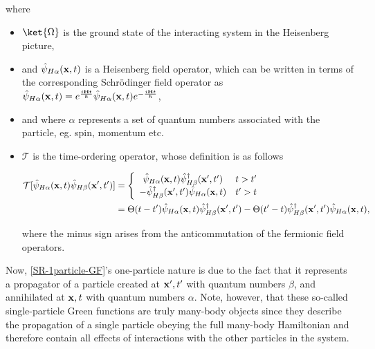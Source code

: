 where \begin{itemize}
    \item $\ket{\Omega}$ is the ground state of the interacting system in the Heisenberg picture,
    \item and $\hat{\psi}_{H \alpha}({\bf x}, t)$ is a Heisenberg field operator, which can be written in terms of the corresponding Schr\"odinger field operator as $\hat{\psi}_{H \alpha}({\bf x}, t) = e^{\frac{i {\bf H} t}{\hbar}} \hat{\psi}_{H \alpha}({\bf x}, t) e^{-\frac{i {\bf H} t}{\hbar}}$, 
    \item and where $\alpha$ represents a set of quantum numbers associated with the particle, eg. spin, momentum etc. \item $\mathcal{T}$ is the time-ordering operator, whose definition is as follows 
    
    \begin{equation} \begin{split}
        \mathcal{T} [\hat{\psi}_{H \alpha}({\bf x}, t) \hat{\psi}_{H \beta}({\bf x}', t')] &= \left\{ \begin{array}{cc}
           \hat{\psi}_{H \alpha}({\bf x}, t) \hat{\psi}^\dagger_{H \beta}({\bf x}', t') & t > t' \\ 
           -  \hat{\psi}^\dagger_{H \beta}({\bf x}', t')   \hat{\psi}_{H \alpha}({\bf x}, t) & t' > t 
        \end{array}\right. \\
        &= \Theta(t-t')\hat{\psi}_{H \alpha}({\bf x}, t) \hat{\psi}^\dagger_{H \beta}({\bf x}', t') - \Theta(t'-t)\hat{\psi}^\dagger_{H \beta}({\bf x}', t')   \hat{\psi}_{H \alpha}({\bf x}, t),
    \end{split}
    \end{equation}
    
    where the minus sign arises from the anticommutation of the fermionic field operators. \\
\end{itemize}

Now, \cref{SR-1particle-GF}'s one-particle nature is due to the fact that it represents a propagator of a particle created at ${\bf x}', t'$ with quantum numbers $\beta$, and annihilated at ${\bf x}, t$ with quantum numbers $\alpha$. Note, however, that these so-called single-particle Green functions are truly many-body objects since they describe the propagation of a single particle obeying the full many-body Hamiltonian and therefore contain all effects of interactions with the other particles in the system. \\

